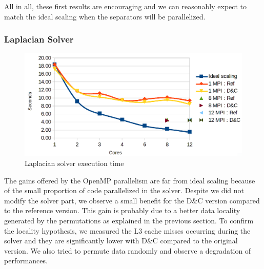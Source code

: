 \documentclass{IOS-Book-Article}
\begin{document}
All in all, these first results are encouraging and we can reasonably expect to match the ideal scaling when the separators will be parallelized.

\subsubsection{Laplacian Solver}
\begin{figure}[htp]
 \centering
 \label{fig7}
 \includegraphics[scale=0.2]{Laplacian_solver_time.png}
 \caption{Laplacian solver execution time}
\end{figure}
The gains offered by the OpenMP parallelism are far from ideal scaling because of the small proportion of code parallelized in the solver.
Despite we did not modify the solver part, we observe a small benefit for the D\&C version compared to the reference version.
This gain is probably due to a better data locality generated by the permutations as explained in the previous section.
To confirm the locality hypothesis, we measured the L3 cache misses occurring during the solver and they are significantly lower with D\&C compared to the original version.
We also tried to permute data randomly and observe a degradation of performances.
\end{document}
